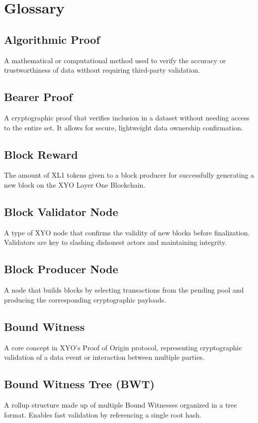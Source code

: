 \documentclass{article}
\begin{document}
\newpage

\section*{Glossary}

\subsection*{Algorithmic Proof}
A mathematical or computational method used to verify the accuracy or trustworthiness of data without requiring third-party validation.

\subsection*{Bearer Proof}
A cryptographic proof that verifies inclusion in a dataset without needing access to the entire set. It allows for secure, lightweight data ownership confirmation.

\subsection*{Block Reward}
The amount of XL1 tokens given to a block producer for successfully generating a new block on the XYO Layer One Blockchain.

\subsection*{Block Validator Node}
A type of XYO node that confirms the validity of new blocks before finalization. Validators are key to slashing dishonest actors and maintaining integrity.

\subsection*{Block Producer Node}
A node that builds blocks by selecting transactions from the pending pool and producing the corresponding cryptographic payloads.

\subsection*{Bound Witness}
A core concept in XYO's Proof of Origin protocol, representing cryptographic validation of a data event or interaction between multiple parties.

\subsection*{Bound Witness Tree (BWT)}
A rollup structure made up of multiple Bound Witnesses organized in a tree format. Enables fast validation by referencing a single root hash.
\end{document}

